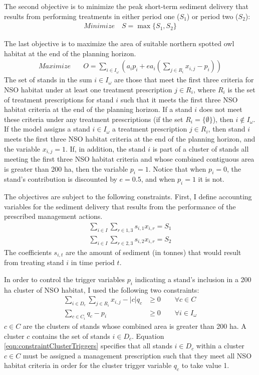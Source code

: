The second objective is to minimize the peak short-term sediment delivery that results from performing treatments in either period one ($S_1$) or period two ($S_2$):
\begin{align}
Minimize \quad S = \max \{S_1,S_2\} \label{eqn:objSediment}
\end{align}

The last objective is to maximize the area of suitable northern spotted owl habitat at the end of the planning horizon.
\begin{align}
Maximize \quad & O = \sum_{i\in I_\omega} \left(a_i p_i + e a_i \left( \sum_{j \in R_i} x_{i,j}-p_i \right) \right) \label{eqn:objOwl}
\end{align}
The set of stands in the sum $i \in I_\omega$ are those that meet the first three criteria for NSO habitat under at least one treatment prescription $j \in R_i$, where $R_i$ is the set of treatment prescriptions for stand $i$ such that it meets the first three NSO habitat criteria at the end of the planning horizon. If a stand $i$ does not meet these criteria under any treatment prescriptions (if the set $R_i = \{\emptyset\}$), then $i \notin I_\omega$. If the model assigns a stand $i \in I_\omega$ a treatment prescription $j \in R_i$, then stand $i$ meets the first three NSO habitat criteria at the end of the planning horizon, and the variable $x_{i,j}=1$. If, in addition, the stand $i$ is part of a cluster of stands all meeting the first three NSO habitat criteria and whose combined contiguous area is greater than 200 ha, then the variable $p_i = 1$. Notice that when $p_i = 0$, the stand's contribution is discounted by $e = 0.5$, and when $p_i = 1$ it is not.

The objectives are subject to the following constraints. First, I define accounting variables for the sediment delivery that results from the performance of the prescribed management actions.
\begin{align}
\sum_{i\in I} \sum_{r\in 1,3} s_{i,1} x_{i,r} = S_1 \label{eqn:constraintSediment1}\\
\sum_{i\in I} \sum_{r\in 2,3} s_{i,2} x_{i,r} = S_2 \label{eqn:constraintSediment2}
\end{align}
The coefficients $s_{i,t}$ are the amount of sediment (in tonnes) that would result from treating stand $i$ in time period $t$.

In order to control the trigger variables $p_i$ indicating a stand's inclusion in a 200 ha cluster of NSO habitat, I used the following two constraints:
\begin{align}
\sum_{i \in D_c} \sum_{j \in R_i} x_{i,j} - |c| q_c &\ge 0 \qquad \forall c \in C \label{eqn:constraintClusterTriggers}\\
\sum_{c \in C_i} q_c - p_i &\ge 0 \qquad \forall i \in I_\omega \label{eqn:constraintPVarTriggers}
\end{align}
$c \in C$ are the clusters of stands whose combined area is greater than 200 ha. A cluster $c$ contains the set of stands $i \in D_c$. Equation \eqref{eqn:constraintClusterTriggers} specifies that all stands $i \in D_c$ within a cluster $c \in C$ must be assigned a management prescription such that they meet all NSO habitat criteria in order for the cluster trigger variable $q_c$ to take value 1.

